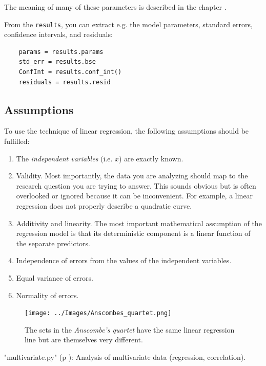 The meaning of many of these parameters is described in the chapter .

From the \texttt{results}, you can extract e.g. the model parameters, standard errors, confidence intervals, and residuals:

\begin{lstlisting}
    params = results.params
    std_err = results.bse
    ConfInt = results.conf_int()
    residuals = results.resid
\end{lstlisting}

\subsection{Assumptions}

To use the technique of linear regression, the following assumptions should be fulfilled:

\begin{enumerate}
  \item The \emph{independent variables} (i.e. $x$) are exactly known.
  \item Validity. Most importantly, the data you are analyzing should map to the research question you are trying to answer. This sounds obvious but is often overlooked or ignored because it can be inconvenient. For example, a linear regression does not properly describe a quadratic curve.
  \item Additivity and linearity. The most important mathematical assumption of the regression model is that its deterministic component is a linear function of the separate predictors.
  \item Independence of errors from the values of the independent variables.
  \item Equal variance of errors.
  \item Normality of errors.
\end{enumerate}

\begin{figure}
  \centering
  \texttt{[image: ../Images/Anscombes\_quartet.png]}\\
  \caption{The sets in the \emph{Anscombe's quartet} have the same linear regression line but are themselves very different.}
\end{figure}

\PyImg "multivariate.py" (p \pageref{py:multivariate}): Analysis of multivariate data (regression, correlation).

